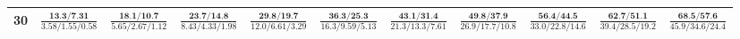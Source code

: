 \documentclass{slides}
\begin{document}
{{{\begin{tabular}{|c|c|c|c|c|c|c|c|c|c|c|}
\hline
30 & $\frac{\textbf{13.3/7.31}}{3.58/1.55/0.58}$ & $\frac{\textbf{18.1/10.7}}{5.65/2.67/1.12}$ & $\frac{\textbf{23.7/14.8}}{8.43/4.33/1.98}$ & $\frac{\textbf{29.8/19.7}}{12.0/6.61/3.29}$ & $\frac{\textbf{36.3/25.3}}{16.3/9.59/5.13}$ & $\frac{\textbf{43.1/31.4}}{21.3/13.3/7.61}$ & $\frac{\textbf{49.8/37.9}}{26.9/17.7/10.8}$ & $\frac{\textbf{56.4/44.5}}{33.0/22.8/14.6}$ & $\frac{\textbf{62.7/51.1}}{39.4/28.5/19.2}$ & $\frac{\textbf{68.5/57.6}}{45.9/34.6/24.4}$ \\
\hline
\end{tabular}}}}
\end{document}
